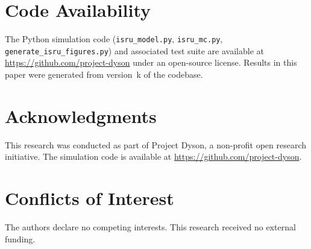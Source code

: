 \documentclass[preprint,12pt]{elsarticle}
\begin{document}
\section*{Code Availability}

The Python simulation code (\texttt{isru\_model.py}, \texttt{isru\_mc.py}, \texttt{generate\_isru\_figures.py}) and associated test suite are available at \url{https://github.com/project-dyson} under an open-source license. Results in this paper were generated from version~k of the codebase.


\section*{Acknowledgments}

This research was conducted as part of Project Dyson, a non-profit open research initiative. The simulation code is available at \url{https://github.com/project-dyson}.

\section*{Conflicts of Interest}

The authors declare no competing interests. This research received no external funding.
\end{document}
